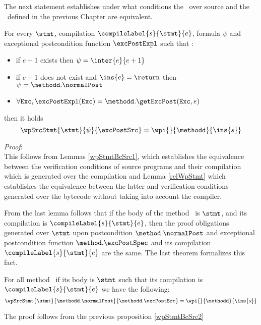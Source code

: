 
The next statement establishes under what conditions
 the \wpName \  over source and the \wpName \ defined in the previous Chapter are equivalent.

\begin{wpStmtBcSrc2} \label{wpStmtBcSrc2}
For every $\stmt$, compilation $\compileLabel{s}{\stmt}{e}$,  formula $\psi$ and 
   exceptional postcondition  function $\excPostExpl $ such that :
 
  \begin{itemize}
         \item if $e + 1$ exists then  $\psi = \inter{e}{e+1}$
	 \item if $e+1$ does not exist and $\ins{e} = \return$  then $\psi = \methodd.\normalPost$
	 \item$\forall \mbox{\rm\texttt{Exc}} ,  \excPostExpl( \mbox{\rm\texttt{Exc}} ) = \methodd.\getExcPost(\mbox{\rm\texttt{Exc}}, e) $ 
  \end{itemize}
      then it holds 
$$ \wpSrcStmt{\stmt}{\psi }{\excPostSrc }  = \wpi{}{\methodd}{\ins{s} }$$
\end{wpStmtBcSrc2}
\textit{Proof}: \\
This follows from Lemmas \ref{wpStmtBcSrc1}, which establishes the equivalence between the verification conditions of
 source programs  and their compilation which is generated over the compilation and  Lemma \ref{relWpStmt}  which establishes 
the equivalence between the latter and verification conditions generated over the bytecode without taking into account the compiler.\\
\Qed


From the last lemma follows that if the body of the  method \methodd \ is $\stmt$, and its compilation is $\compileLabel{s}{\stmt}{e}$, then 
the proof obligations generated over $\stmt$ upon postcondition $\method.\normalPost$ and exceptional
postcondition function  $\method.\excPostSpec$     and its compilation $\compileLabel{s}{\stmt}{e}$ are the same. The last theorem 
formalizes this fact.

\begin{theorem}
For all method \methodd \ if its body is $\stmt$ such that its compilation is 
 $\compileLabel{s}{\stmt}{e}$  we have the following:
$$ \wpSrcStmt{\stmt}{\methodd.\normalPost }{\methodd.\excPostSrc }  = \wpi{}{\methodd}{\ins{s} }$$
\end{theorem}
The proof follows from the previous proposition \ref{wpStmtBcSrc2}




